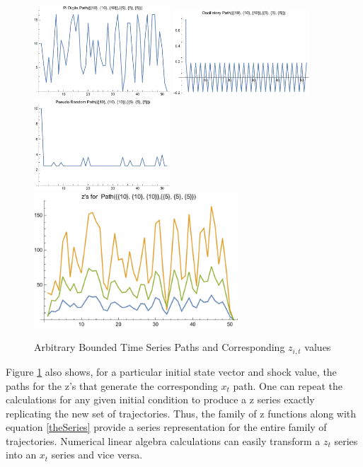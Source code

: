 \documentclass[12pt]{article}
\begin{document}
\begin{figure}
  \centering
\includegraphics[width=2in]{piPath.pdf}
\includegraphics[width=2in]{oscillPath.pdf}
\includegraphics[width=2in]{pseudoPath.pdf}
\includegraphics[width=3in]{theZs.pdf}  
  
  \caption{Arbitrary Bounded Time Series Paths and Corresponding $z_{i,t}$ values}\label{arbpaths}
\end{figure}





Figure \ref{arbpaths} also shows, for a particular initial state vector and shock value,  the paths for the   z's that generate the corresponding $x_t$ path.
One can repeat the calculations for any given initial condition to produce
a z series exactly replicating the new set of trajectories.  Thus, the family
of z functions along with equation \ref{theSeries} provide a series 
representation for the entire family of trajectories. Numerical linear algebra calculations can easily transform a $z_t$ series into an $x_t$ series and vice versa.
\end{document}
